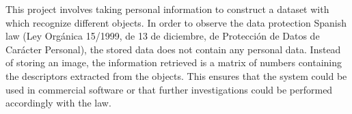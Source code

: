 	This project involves taking personal information to construct a dataset with which recognize different objects. 
	In order to observe the data protection Spanish law (Ley Orgánica 15/1999, de 13 de diciembre, de Protección de Datos de Carácter Personal), the stored data does not contain any personal data. 
	Instead of storing an image, the information retrieved is a matrix of numbers containing the descriptors extracted from the objects. 
	This ensures that the system could be used in commercial software or that further investigations could be performed accordingly with the law. 

